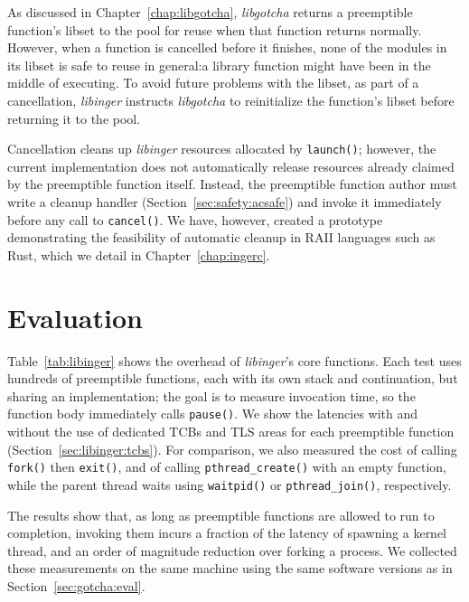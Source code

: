 As discussed in Chapter~\ref{chap:libgotcha}, \textit{libgotcha} returns a
preemptible function's libset to the pool for reuse when that function returns
normally.  However, when a function is cancelled before it finishes, none of the
modules in its libset is safe to reuse in general:\@ a library function might have
been in the middle of executing.  To avoid future problems with the libset, as part
of a cancellation, \textit{libinger} instructs \textit{libgotcha} to reinitialize the
function's libset before returning it to the pool.

Cancellation cleans up \textit{libinger} resources allocated by \texttt{launch()};
however, the current implementation does not automatically release resources already
claimed by the preemptible function itself.  Instead, the preemptible function author
must write a cleanup handler (Section~\ref{sec:safety:acsafe}) and invoke it
immediately before any call to \texttt{cancel()}.  We have, however, created a
prototype
demonstrating the feasibility of automatic cleanup in RAII languages such as Rust,
which we detail in Chapter~\ref{chap:ingerc}.


\section{Evaluation}
\label{sec:libinger:ueval}

Table~\ref{tab:libinger} shows the overhead of \textit{libinger}'s core functions.
Each test uses hundreds of preemptible functions, each with its own stack and
continuation, but sharing an implementation; the goal is to measure invocation time,
so the function body immediately calls \texttt{pause()}.  We show the latencies with
and without the use of dedicated TCBs and TLS areas for each preemptible function
(Section~\ref{sec:libinger:tcbs}).
For comparison, we also measured the cost of calling \texttt{fork()} then
\texttt{exit()}, and of calling \texttt{pthread\_create()} with an empty function,
while the parent
thread waits using \texttt{waitpid()} or \texttt{pthread\_join()}, respectively.

The results show that, as long as preemptible functions are allowed to run
to completion, invoking them incurs a fraction of the latency of spawning a kernel
thread, and an order of magnitude reduction over forking a process.  We collected
these measurements on the same machine using the same software versions as in
Section~\ref{sec:gotcha:eval}.

